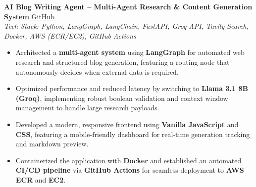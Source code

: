 \textbf{AI Blog Writing Agent -- Multi-Agent Research \& Content Generation System} \hfill \href{https://github.com/AjAyrAo43/AI-BLOG-WRITING-AGENT}{GitHub} \\
\textit{Tech Stack: Python, LangGraph, LangChain, FastAPI, Groq API, Tavily Search, Docker, AWS (ECR/EC2), GitHub Actions}

\begin{itemize}
    \item Architected a \textbf{multi-agent system} using \textbf{LangGraph} for automated web research and structured blog generation, featuring a routing node that autonomously decides when external data is required.
    \item Optimized performance and reduced latency by switching to \textbf{Llama 3.1 8B (Groq)}, implementing robust boolean validation and context window management to handle large research payloads.
    \item Developed a modern, responsive frontend using \textbf{Vanilla JavaScript} and \textbf{CSS}, featuring a mobile-friendly dashboard for real-time generation tracking and markdown preview.
    \item Containerized the application with \textbf{Docker} and established an automated \textbf{CI/CD pipeline} via \textbf{GitHub Actions} for seamless deployment to \textbf{AWS ECR} and \textbf{EC2}.
\end{itemize}
